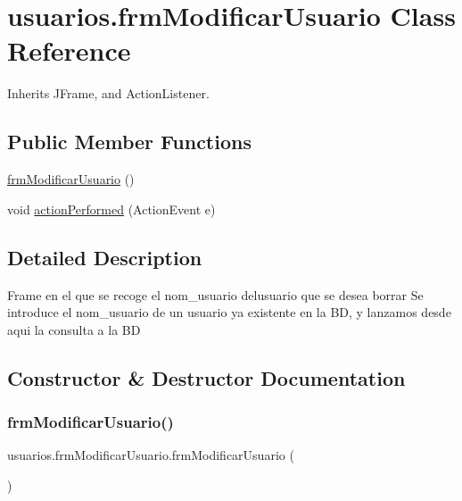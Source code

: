 \hypertarget{classusuarios_1_1frm_modificar_usuario}{}\section{usuarios.\+frm\+Modificar\+Usuario Class Reference}
\label{classusuarios_1_1frm_modificar_usuario}


Inherits J\+Frame, and Action\+Listener.

\subsection*{Public Member Functions}
\begin{DoxyCompactItemize}
\item 
\hyperlink{classusuarios_1_1frm_modificar_usuario_a52360385a0bf37173d583fe8ce15dac3}{frm\+Modificar\+Usuario} ()
\item 
void \hyperlink{classusuarios_1_1frm_modificar_usuario_a7c14247ca75887ee6daceeb74ba55cc3}{action\+Performed} (Action\+Event e)
\end{DoxyCompactItemize}


\subsection{Detailed Description}
Frame en el que se recoge el nom\+\_\+usuario delusuario que se desea borrar Se introduce el nom\+\_\+usuario de un usuario ya existente en la BD, y lanzamos desde aqui la consulta a la BD 

\subsection{Constructor \& Destructor Documentation}
\mbox{\label{classusuarios_1_1frm_modificar_usuario_a52360385a0bf37173d583fe8ce15dac3}} 
\subsubsection{\texorpdfstring{frm\+Modificar\+Usuario()}{frmModificarUsuario()}}
{\footnotesize\ttfamily usuarios.\+frm\+Modificar\+Usuario.\+frm\+Modificar\+Usuario (\begin{DoxyParamCaption}{ }\end{DoxyParamCaption})}

